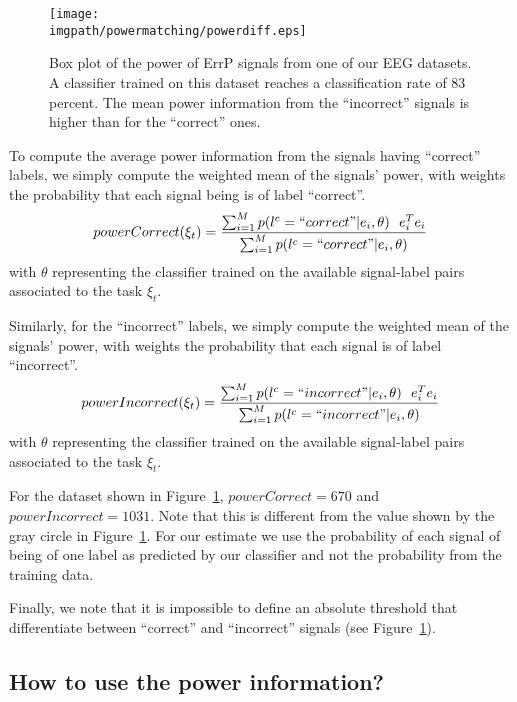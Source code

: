 \begin{figure}[!htbp]
\centering
\texttt{[image: \\imgpath/powermatching/powerdiff.eps]}
\caption{Box plot of the power of ErrP signals from one of our EEG datasets. A classifier trained on this dataset reaches a classification rate of 83 percent. The mean power information from the ``incorrect'' signals is higher than for the ``correct'' ones.}
\label{fig:EEGpower}
\end{figure} 

To compute the average power information from the signals having ``correct'' labels, we simply compute the weighted mean of the signals' power, with weights the probability that each signal  being is of label ``correct''.
\begin{eqnarray}
powerCorrect(\xi_t) = \frac{\sum_{i = 1}^{M} p(l^c = ``correct"| e_i , \theta) ~~ e_i^T e_i}{\sum_{i = 1}^{M} p(l^c = ``correct"| e_i , \theta)}
\label{eq:powerCorrect}
\end{eqnarray}
with $\theta$ representing the classifier trained on the available signal-label pairs associated to the task $\xi_t$.

Similarly, for the ``incorrect'' labels, we simply compute the weighted mean of the signals' power, with weights the probability that each signal is of label ``incorrect''. 
\begin{eqnarray}
powerIncorrect(\xi_t) = \frac{\sum_{i = 1}^{M} p(l^c = ``incorrect"| e_i , \theta) ~~ e_i^T e_i}{\sum_{i = 1}^{M} p(l^c = ``incorrect"| e_i , \theta)}
\label{eq:powerIncorrect}
\end{eqnarray}
with $\theta$ representing the classifier trained on the available signal-label pairs associated to the task $\xi_t$.

For the dataset shown in Figure~\ref{fig:EEGpower}, $powerCorrect = 670$ and $powerIncorrect = 1031$. Note that this is different from the value shown by the gray circle in Figure~\ref{fig:EEGpower}. For our estimate we use the probability of each signal of being of one label as predicted by our classifier and not the probability from the training data.

Finally, we note that it is impossible to define an absolute threshold that differentiate between ``correct'' and ``incorrect'' signals (see Figure~\ref{fig:EEGpower}). 

\subsection{How to use the power information?}

